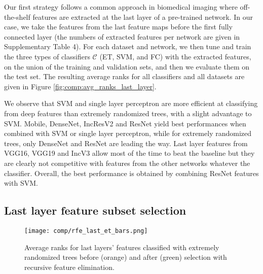 Our first strategy follows a common approach in biomedical imaging where off-the-shelf features are extracted at the last layer of a pre-trained network. In our case, we take the features from the last feature maps before the first fully connected layer (the numbers of extracted features per network are given in Supplementary Table 4). For each dataset and network, we then tune and train the three types of classifiers $\mathcal{C}$ (ET, SVM, and FC) with the extracted features, on the union of the training and validation sets, and then we evaluate them on the test set. The resulting average ranks for all classifiers and all datasets are given in Figure \ref{fig:comp:avg_ranks_last_layer}.

We observe that SVM and single layer perceptron are more efficient at classifying from deep features than extremely randomized trees, with a slight advantage to SVM. Mobile, DenseNet, IncResV2 and ResNet yield best performances when combined with SVM or single layer perceptron, while for extremely randomized trees, only DenseNet and ResNet are leading the way. Last layer features from VGG16, VGG19 and IncV3 allow most of the time to beat the baseline but they are clearly not competitive with features from the other networks whatever the classifier. Overall, the best performance is obtained by combining ResNet features with SVM.



\subsection{Last layer feature subset selection}
\label{ssec:comp:exp_feat_sel}


\begin{figure}
	\center 
    \texttt{[image: comp/rfe\_last\_et\_bars.png]}
    \caption{Average ranks for last layers' features classified with extremely randomized trees before (orange) and after (green) selection with recursive feature elimination.}
    \label{fig:comp:exp_rfe_last_et_cmp}
\end{figure}

